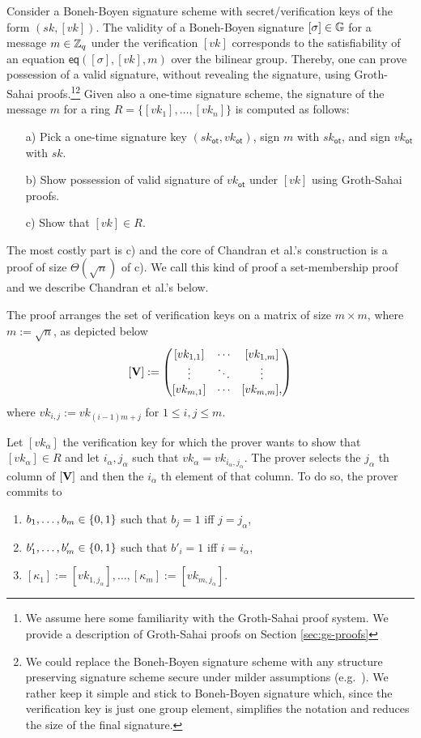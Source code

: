 Consider a {Boneh-Boyen signature scheme} \cite{EC:BonBoy04a} with secret/verification keys of the form $(sk,[vk])$. The validity of a Boneh-Boyen signature $[\sigma]\in\mathbb{G}$ for a message $m\in\mathbb{Z}_q$ under the verification $[vk]$ corresponds to the satisfiability of an equation $\mathsf{eq}([\sigma],[vk],m)$ over the bilinear group. Thereby, one can prove possession of a valid signature, without revealing the signature, using Groth-Sahai proofs.\cite{EC:GroSah08}\footnote{We assume here some familiarity with the Groth-Sahai proof system. We provide a description of Groth-Sahai proofs on Section \ref{sec:gs-proofs}}\footnote{We could replace the Boneh-Boyen signature scheme with any structure preserving signature scheme secure under milder assumptions (e.g.~\cite{EPRINT:JutRoy17}). We rather keep it simple and stick to Boneh-Boyen signature which, since the verification key is just one group element, simplifies the notation and reduces the size of the final signature.}  Given also a {one-time signature scheme}, the signature of the message $m$ for a ring $R=\{[vk_1],\ldots,[vk_n]\}$ is computed as follows:
\begin{itemize}
	\item[a)] Pick a one-time signature key $(sk_\mathsf{ot},vk_\mathsf{ot})$, sign $m$ with $sk_\mathsf{ot}$, and sign $vk_\mathsf{ot}$ with $sk$.
	\item[b)] Show possession of valid signature of $vk_\mathsf{ot}$ under $[vk]$ using Groth-Sahai proofs.
	\item[c)] Show that $[vk]\in R$.
\end{itemize}
The most costly part is c) and the core of Chandran et al.'s construction is a proof of size $\Theta(\sqrt{n})$ of c). We call this kind of proof a set-membership proof and we describe Chandran et al.'s below.
 
The proof arranges the set of verification keys on a matrix of size $m\times m$, where $m:=\sqrt{n}$, as depicted below
$$
[\mathbf{{V}}]:=
\begin{pmatrix}
[vk_{1,1}] & \cdots & [vk_{1,m}]\\
\vdots     & \ddots & \vdots \\
[vk_{m,1}]  & \cdots & [vk_{m,m}],
\end{pmatrix}
$$
where $vk_{i,j}:=vk_{(i-1)m+j}$ for $1\leq i,j \leq m$.

Let $[vk_\alpha]$ the verification key for which the prover wants to show that $[vk_\alpha]\in R$ and let $i_\alpha,j_\alpha$ such that $vk_\alpha = vk_{i_\alpha,j_\alpha}$. The prover selects the $j_\alpha$ th column of $[\mathbf{{V}}]$ and then the $i_\alpha$ th element of that column. To do so, the prover commits to 
\begin{enumerate}
\item $b_1,\ldots,b_m\in\{0,1\}$ such that $b_j=1$ iff $j=j_\alpha$,
\item $b'_1,\ldots,b'_m\in\{0,1\}$ such that $b'_i=1$ iff $i=i_\alpha$,
\item $[\kappa_1]:=[vk_{1,j_\alpha}],\ldots,[\kappa_m]:=[vk_{m,j_\alpha}]$.
\end{enumerate}

